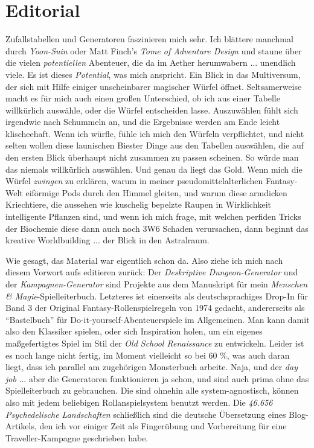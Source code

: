 \documentclass[11pt]{wbzine}
\begin{document}
\begin{titlepage}



\end{titlepage}

\tableofcontents

\section{Editorial}


Zufallstabellen und Generatoren faszinieren mich sehr. Ich blättere
manchmal durch \textit{Yoon-Suin} oder Matt Finch's \textit{Tome of
Adventure Design} und staune über die vielen \textit{potentiellen}
Abenteuer, die da im Aether herumwabern ... unendlich viele. 
Es ist dieses \textit{Potential}, was
mich anspricht. Ein Blick in das Multiversum, der sich mit Hilfe
einiger unscheinbarer magischer Würfel öffnet. Seltsamerweise macht
es für mich auch einen großen Unterschied, ob ich aus einer Tabelle
willkürlich auswähle, oder die Würfel entscheiden lasse. Auszuwählen
fühlt sich irgendwie nach Schummeln an, und die Ergebnisse werden am
Ende leicht klischeehaft. Wenn ich würfle, fühle ich
mich den Würfeln verpflichtet, und nicht selten wollen diese
launischen Biester Dinge aus den Tabellen auswählen, die 
auf den ersten Blick überhaupt nicht zusammen zu passen scheinen. So
würde man das niemals willkürlich auswählen. Und genau da liegt das
Gold. Wenn mich die Würfel \textit{zwingen} zu erklären, warum in
meiner pseudomittelalterlichen Fantasy-Welt eiförmige Pods durch den
Himmel gleiten, und warum diese armdicken Kriechtiere, die aussehen wie
kuschelig bepelzte Raupen in Wirklichkeit intelligente Pflanzen
sind, und wenn ich mich frage, mit welchen perfiden Tricks der
Biochemie diese dann auch noch 3W6 Schaden verursachen, dann beginnt
das kreative Worldbuilding ... der Blick in den Astralraum.

Wie gesagt, das Material war eigentlich schon da. Also ziehe ich
mich nach diesem Vorwort aufs editieren zurück: Der 
\textit{Deskriptive Dungeon-Generator} und der
\textit{Kampagnen-Generator} sind Projekte aus dem Manuskript für
mein \textit{Menschen \& Magie}-Spielleiterbuch. Letzteres ist
einerseits als deutschsprachiges Drop-In 
für Band 3 der Original Fantasy-Rollenspielregeln von 1974 gedacht,
andererseits als ``Bastelbuch'' für Do-it-yourself-Abenteuerspiele im
Allgemeinen. Man kann damit also den Klassiker spielen, oder 
sich Inspiration holen, um ein eigenes maßgefertigtes Spiel im
Stil der \textit{Old School Renaissance} zu entwickeln. Leider 
ist es noch lange nicht fertig, im Moment vielleicht so bei 60 \%, was
auch daran liegt, dass ich parallel am zugehörigen Monsterbuch
arbeite. Naja, und der \textit{day job} ... aber
die Generatoren funktionieren ja schon, und sind auch prima ohne das
Spielleiterbuch zu gebrauchen. Die sind ohnehin alle
system-agnostisch, können also mit jedem beliebigen
Rollanspielsystem benutzt werden. Die \textit{46.656 Psychedelische
Landschaften} schließlich sind die deutsche Übersetzung eines
Blog-Artikels, den ich vor einiger Zeit als Fingerübung und
Vorbereitung für eine Traveller-Kampagne geschrieben habe.  
\end{document}
